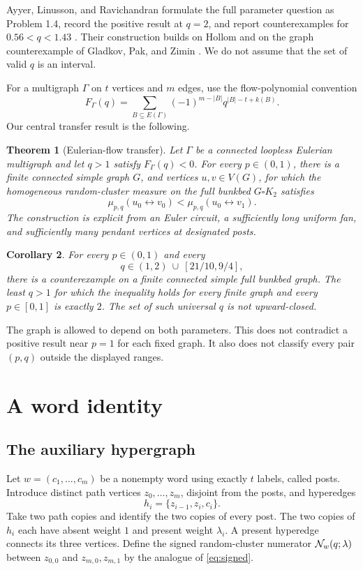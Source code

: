 \documentclass[11pt,a4paper]{article}
\newtheorem{theorem}{Theorem}[section]
\newtheorem{corollary}[theorem]{Corollary}
\theoremstyle{remark}\newtheorem{remark}[theorem]{Remark}
\newcommand{\bb}{\square K_2}
\begin{document}
Ayyer, Linusson, and Ravichandran formulate the full parameter question as Problem 1.4, record the positive result at $q=2$, and report counterexamples for $0.56<q<1.43$ \cite{ALR}. Their construction builds on Hollom and on the graph counterexample of Gladkov, Pak, and Zimin \cite{GPZ,Hollom}. We do not assume that the set of valid $q$ is an interval.

For a multigraph $\Gamma$ on $t$ vertices and $m$ edges, use the flow-polynomial convention
\begin{equation}\label{eq:flow}
F_\Gamma(q)=\sum_{B\subseteq E(\Gamma)}(-1)^{m-|B|}q^{|B|-t+k(B)}.
\end{equation}
Our central transfer result is the following.
\begin{theorem}[Eulerian-flow transfer]\label{thm:transfer}
Let $\Gamma$ be a connected loopless Eulerian multigraph and let $q>1$ satisfy $F_\Gamma(q)<0$. For every $p\in(0,1)$, there is a finite connected simple graph $G$, and vertices $u,v\in V(G)$, for which the homogeneous random-cluster measure on the full bunkbed $G\bb$ satisfies
\[
\mu_{p,q}(u_0\leftrightarrow v_0)<\mu_{p,q}(u_0\leftrightarrow v_1).
\]
The construction is explicit from an Euler circuit, a sufficiently long uniform fan, and sufficiently many pendant vertices at designated posts.
\end{theorem}
\begin{corollary}\label{cor:main}
For every $p\in(0,1)$ and every
\[
q\in(1,2)\ \cup\ [21/10,9/4],
\]
there is a counterexample on a finite connected simple full bunkbed graph. The least $q>1$ for which the inequality holds for every finite graph and every $p\in[0,1]$ is exactly $2$. The set of such universal $q$ is not upward-closed.
\end{corollary}
The graph is allowed to depend on both parameters. This does not contradict a positive result near $p=1$ for each fixed graph. It also does not classify every pair $(p,q)$ outside the displayed ranges.

\section{A word identity}
\subsection{The auxiliary hypergraph}
Let $w=(c_1,\ldots,c_m)$ be a nonempty word using exactly $t$ labels, called posts. Introduce distinct path vertices $z_0,\ldots,z_m$, disjoint from the posts, and hyperedges
\[
h_i=\{z_{i-1},z_i,c_i\}.
\]
Take two path copies and identify the two copies of every post. The two copies of $h_i$ each have absent weight $1$ and present weight $\lambda_i$. A present hyperedge connects its three vertices. Define the signed random-cluster numerator $\mathcal N_w(q;\lambda)$ between $z_{0,0}$ and $z_{m,0},z_{m,1}$ by the analogue of \eqref{eq:signed}.
\end{document}
